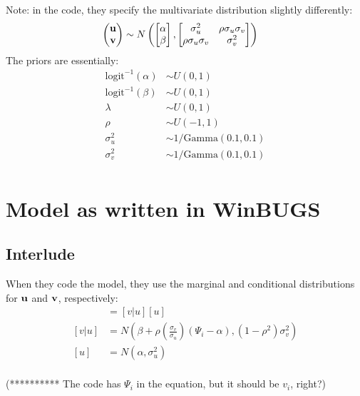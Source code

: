 \documentclass[fleqn]{article}
\begin{document}
Note:  in the code, they specify the multivariate distribution slightly differently:
%
\begin{align*}
  \begin{pmatrix}
     \bf{u} \\
     \bf{v} 
\end{pmatrix}
& \sim N\left( \begin{bmatrix} \alpha \\ \beta  \end{bmatrix} , \begin{bmatrix}  \sigma_u^2 & \rho\sigma_u\sigma_v \\
                                                                 \rho\sigma_u\sigma_v  & \sigma_v^2  \end{bmatrix}  \right)
\end{align*}
%
%
The priors are essentially:
\begin{align*}
  \mbox{logit}^{-1} (\alpha) & \sim U(0, 1)  \\
  \mbox{logit}^{-1} (\beta) & \sim U(0, 1)  \\
  \lambda & \sim U(0,1)  \\
  \rho & \sim U(-1, 1)  \\
  \sigma_u^2 & \sim 1 / \mbox{Gamma}(0.1, 0.1)  \\
  \sigma_v^2 & \sim 1 / \mbox{Gamma}(0.1, 0.1)  \\
\end{align*} 

\section{Model as written in WinBUGS}
%
\subsection{Interlude}
%
When they code the model, they use the marginal and conditional distributions for $\bf{u}$ and $\bf{v}$, respectively:
\begin{align*}
  [u, v] & = [v|u][u]  \\
  [v | u] & = N \left(\beta + \rho \left( \frac{\sigma_v}{\sigma_u} \right) \left(\Psi_i - \alpha \right), \left( 1 - \rho^2 \right) \sigma_v^2 \right) \\
  [u] & = N \left(\alpha, \sigma_u^2 \right) \\
\end{align*}
%

(********** The code has $\Psi_i$ in the equation, but it should be $v_i$, right?)
%
%
\end{document}

